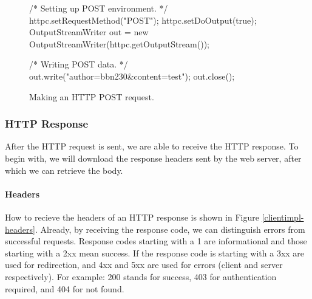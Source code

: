 \begin{figure*}[ht] %
\begin{center}
\begin{code}
/* Setting up POST environment. */
httpc.setRequestMethod("POST");
httpc.setDoOutput(true);
OutputStreamWriter out = new OutputStreamWriter(httpc.getOutputStream());

/* Writing POST data. */
out.write("author=bbn230&content=test");
out.close();
\end{code}
\caption{Making an HTTP POST request.\label{clientimpl-post}}
\end{center}
\end{figure*}

% 

\subsubsection{HTTP Response}
After the HTTP request is sent, we are able to receive the HTTP response. To
begin with, we will download the response headers sent by the web server, after
which we can retrieve the body.

\paragraph{Headers}
How to recieve the headers of an HTTP response is shown in Figure
\ref{clientimpl-headers}. Already, by receiving the response code, we can
distinguish errors from successful requests. Response codes starting with a 1 are
informational and those starting with a 2xx mean success. If the response code
is starting with a 3xx are used for redirection, and 4xx and 5xx are used for
errors (client and server respectively). For example: 200 stands for success, 403 for
authentication required, and 404 for not found.

